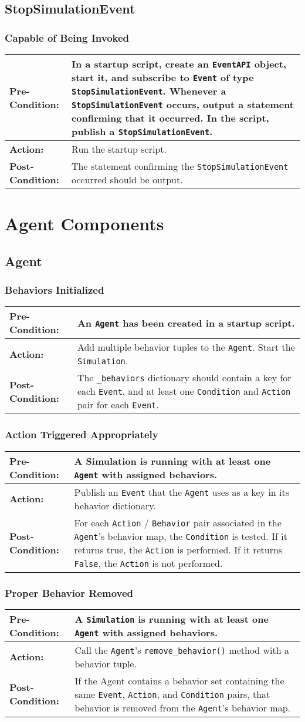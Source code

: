 \documentclass[titlepage]{article}
\newcommand{\testcase}[3]{
    \begin{center}
    \begin{tabular}{| l | p{0.7\textwidth}|}
        \hline
        \rowcolor[gray]{0.8}\textbf{Pre-Condition:} & #1 \\ \hline
        \textbf{Action:} & #2 \\ \hline
        \rowcolor[gray]{0.8}\textbf{Post-Condition:} & #3 \\ \hline
    \end{tabular}
    \end{center}
}
\begin{document}
\subsection{StopSimulationEvent}
\subsubsection{Capable of Being Invoked}
\testcase{In a startup script, create an \texttt{EventAPI} object, start it, and subscribe to \texttt{Event} of type \texttt{StopSimulationEvent}. Whenever a \texttt{StopSimulationEvent} occurs, output a statement confirming that it occurred. In the script, publish a \texttt{StopSimulationEvent}.}{Run the startup script.}{The statement confirming the \texttt{StopSimulationEvent} occurred should be output.}

\section{Agent Components}
\subsection{Agent}
\subsubsection{Behaviors Initialized}
\testcase{An \texttt{Agent} has been created in a startup script.}{Add multiple behavior tuples to the \texttt{Agent}. Start the \texttt{Simulation}.}{The \texttt{\_behaviors} dictionary should contain a key for each \texttt{Event}, and at least one \texttt{Condition} and \texttt{Action} pair for each \texttt{Event}.}

\subsubsection{Action Triggered Appropriately}
\testcase{A Simulation is running with at least one \texttt{Agent} with assigned behaviors.}{Publish an \texttt{Event} that the \texttt{Agent} uses as a key in its behavior dictionary.}{For each \texttt{Action} / \texttt{Behavior} pair associated in the \texttt{Agent}'s behavior map, the \texttt{Condition} is tested.  If it returns true, the \texttt{Action} is performed.  If it returns \texttt{False}, the \texttt{Action} is not performed.}

\subsubsection{Proper Behavior Removed}
\testcase{A \texttt{Simulation} is running with at least one \texttt{Agent} with assigned behaviors.}{Call the \texttt{Agent}'s \texttt{remove\_behavior()} method with a behavior tuple.}{If the Agent contains a behavior set containing the same \texttt{Event}, \texttt{Action}, and \texttt{Condition} pairs, that behavior is removed from the \texttt{Agent}'s behavior map.}
\end{document}
